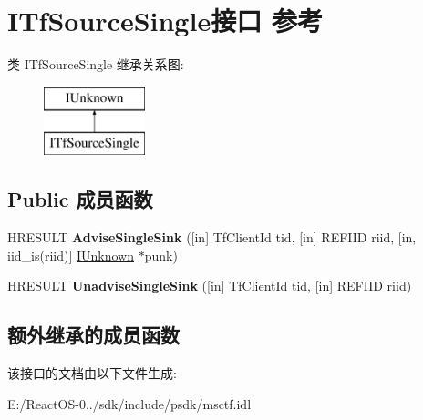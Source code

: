 \hypertarget{interface_i_tf_source_single}{}\section{I\+Tf\+Source\+Single接口 参考}
\label{interface_i_tf_source_single}
类 I\+Tf\+Source\+Single 继承关系图\+:\begin{figure}[H]
\begin{center}
\leavevmode
\includegraphics[height=2.000000cm]{interface_i_tf_source_single}
\end{center}
\end{figure}
\subsection*{Public 成员函数}
\begin{DoxyCompactItemize}
\item 
\mbox{\label{interface_i_tf_source_single_ac560c38fa0610101ed0a2d893c6b3899}} 
H\+R\+E\+S\+U\+LT {\bfseries Advise\+Single\+Sink} (\mbox{[}in\mbox{]} Tf\+Client\+Id tid, \mbox{[}in\mbox{]} R\+E\+F\+I\+ID riid, \mbox{[}in, iid\+\_\+is(riid)\mbox{]} \hyperlink{interface_i_unknown}{I\+Unknown} $\ast$punk)
\item 
\mbox{\label{interface_i_tf_source_single_a7593ff0e2e50aa8184bd3ba8c0921a5a}} 
H\+R\+E\+S\+U\+LT {\bfseries Unadvise\+Single\+Sink} (\mbox{[}in\mbox{]} Tf\+Client\+Id tid, \mbox{[}in\mbox{]} R\+E\+F\+I\+ID riid)
\end{DoxyCompactItemize}
\subsection*{额外继承的成员函数}


该接口的文档由以下文件生成\+:\begin{DoxyCompactItemize}
\item 
E\+:/\+React\+O\+S-\/0../sdk/include/psdk/msctf.\+idl\end{DoxyCompactItemize}
